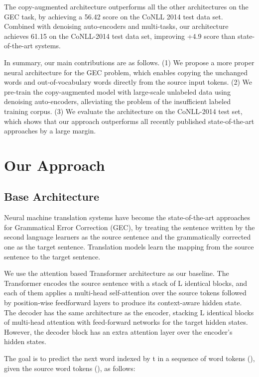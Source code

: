 \documentclass[11pt,a4paper]{article}
\begin{document}
The copy-augmented architecture outperforms all the other architectures on the GEC task, by achieving a 56.42  score on the CoNLL 2014 test data set. Combined with denoising auto-encoders and multi-tasks, our architecture achieves 61.15  on the CoNLL-2014 test data set, improving +4.9  score than state-of-the-art systems. 

In summary, our main contributions are as follows. (1) We propose a more proper neural architecture for the GEC problem, which enables copying the unchanged words and out-of-vocabulary words directly from the source input tokens. (2) We pre-train the copy-augmented model with large-scale unlabeled data using denoising auto-encoders, alleviating the problem of the insufficient labeled training corpus. (3) We evaluate the architecture on the CoNLL-2014 test set, which shows that our approach outperforms all recently published state-of-the-art approaches by a large margin.


\section{Our Approach}

\subsection{Base Architecture}
Neural machine translation systems have become the state-of-the-art approaches for Grammatical Error Correction (GEC), by treating the sentence written by the second language learners as the source sentence and the grammatically corrected one as the target sentence. Translation models learn the mapping from the source sentence to the target sentence. 

We use the attention based Transformer \cite{vaswani2017attention} architecture as our baseline. The Transformer encodes the source sentence with a stack of L identical blocks, and each of them applies a multi-head self-attention over the source tokens followed by position-wise feedforward layers to produce its context-aware hidden state. The decoder has the same architecture as the encoder, stacking L identical blocks of multi-head attention with feed-forward networks for the target hidden states. However, the decoder block has an extra attention layer over the encoder's hidden states.

The goal is to predict the next word indexed by t in a sequence of word tokens (), given the source word tokens (), as follows:
\end{document}
